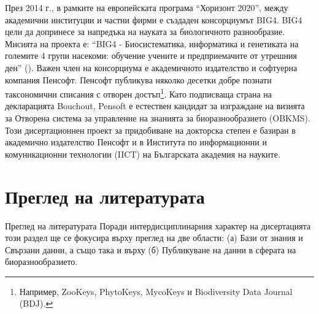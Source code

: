 През 2014 г., в рамките на европейската програма ``Хоризонт 2020'', между академични институции и частни фирми е създаден консорциумът BIG4. BIG4 цели да допринесе за напредъка на науката за биологичното разнообразие. Мисията на проекта е: ``BIG4 - Биосистематика, информатика и генетиката на големите 4 групи насекоми: обучение учените и предприемачите от утрешния ден'' (\cite{university_of_copenhagen_big4_2014}). Важен член на консорциума е академичното издателство и софтуерна компания Пенсофт. Пенсофт публикува няколко десетки добре познати таксономични списания с отворен достъп\footnote{Например, ZooKeys, PhytoKeys, MycoKeys и Biodiversity Data Journal (BDJ).}. Като подписваща страна на декларацията Bouchout, Pensoft е естествен кандидат за  изграждане на визията  за Отворена система за управление на знанията за биоразнообразието (OBKMS). Този дисертационнен проект за придобиване на докторска степен е базиран в академично издателство Пенсофт и в Института по информационни и комуникационни технологии (IICT) на Българската академия на науките.

\section* {Преглед на литературата}
 {Преглед на литературата}
Поради интердисциплинарния характер на дисертацията този раздел ще се фокусира върху преглед на две области: (а) Бази от знания и Свързани данни, а също така и върху (б) Публикуване на данни в сферата на биоразнообразието.

